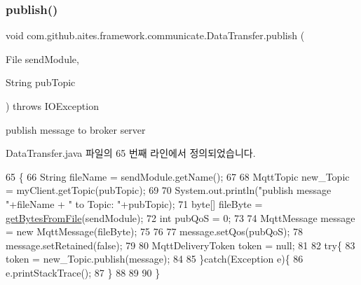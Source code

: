 \subsubsection{\texorpdfstring{publish()}{publish()}\hspace{0.1cm}{\footnotesize\ttfamily [1/2]}}
{\footnotesize\ttfamily void com.\+github.\+aites.\+framework.\+communicate.\+Data\+Transfer.\+publish (\begin{DoxyParamCaption}\item[{File}]{send\+Module,  }\item[{String}]{pub\+Topic }\end{DoxyParamCaption}) throws I\+O\+Exception}



publish message to broker server 



Data\+Transfer.\+java 파일의 65 번째 라인에서 정의되었습니다.


\begin{DoxyCode}
65                                                                            \{ 
66         String fileName = sendModule.getName();
67     
68         MqttTopic new\_Topic = myClient.getTopic(pubTopic);
69         
70         System.out.println(\textcolor{stringliteral}{"publish message "}+fileName + \textcolor{stringliteral}{" to Topic: "}+pubTopic);
71         byte[] fileByte = \mbox{\hyperlink{classcom_1_1github_1_1aites_1_1framework_1_1communicate_1_1_data_transfer_a8eb17deab26fac405a47ba24209f82ed}{getBytesFromFile}}(sendModule); 
72         \textcolor{keywordtype}{int} pubQoS = 0; 
73         
74         MqttMessage message = \textcolor{keyword}{new} MqttMessage(fileByte);
75         
76         
77         message.setQos(pubQoS);
78         message.setRetained(\textcolor{keyword}{false});
79         
80         MqttDeliveryToken token = null;
81     
82         \textcolor{keywordflow}{try}\{
83             token = new\_Topic.publish(message); 
84             
85         \}\textcolor{keywordflow}{catch}(Exception e)\{
86             e.printStackTrace();
87         \}
88     
89 
90     \}
\end{DoxyCode}
\mbox{\label{classcom_1_1github_1_1aites_1_1framework_1_1communicate_1_1_data_transfer_a9604c756c4bb95a16676a98625216c12}} 
